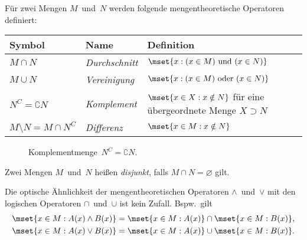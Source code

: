 \documentclass[a4paper]{article}
\begin{document}
\begin{definition}
    Für zwei Mengen $M$~und~$N$ werden folgende mengentheoretische Operatoren definiert:
    \begin{center}
        \begin{tabular}{lll}\toprule
            Symbol                       & Name                & Definition                                                               \\\midrule
            $M \cap N$                   & \emph{Durchschnitt} & $\mset{x : (x \in M) \text{ und } (x \in N)}$                            \\
            $M \cup N$                   & \emph{Vereinigung}  & $\mset{x : (x \in M) \text{ oder } (x \in N)}$                           \\
            $N^C = \complement N$        & \emph{Komplement}   & $\mset{x \in X : x \notin N}$ für eine übergeordnete Menge $X \supset N$ \\
            $M \setminus N = M \cap N^C$ & \emph{Differenz}    & $\mset{x \in M : x \notin N}$                                            \\\bottomrule
        \end{tabular}
    \end{center}
\end{definition}

\begin{figure}
    \caption{Komplementmenge~$N^C = \complement N$.}
\end{figure}

\begin{definition}[disjunkt]
    Zwei Mengen $M$~und~$N$ heißen \emph{disjunkt}, falls $M \cap N = \varnothing$ gilt.
\end{definition}

Die optische Ähnlichkeit der mengentheoretischen Operatoren $\wedge$~und~$\vee$ mit den logischen Operatoren $\cap$~und~$\cup$ ist kein Zufall. Bspw.\ gilt
\begin{gather*}
    \mset{x \in M : A(x) \wedge B(x)} = \mset{x \in M : A(x)} \cap \mset{x \in M : B(x)}, \\
    \mset{x \in M : A(x) \vee B(x)} = \mset{x \in M : A(x)} \cup \mset{x \in M : B(x)}.
\end{gather*}
\end{document}
